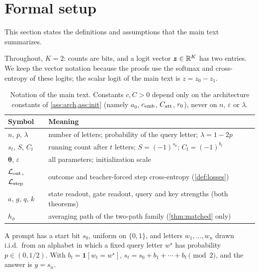 \providecommand{\reg}[1]{\ensuremath{\mathsf{#1}}}

\section{Formal setup}
\label{app:formal}

This section states the definitions and assumptions that the main text summarizes.

\label{app:setup}
Throughout, $K=2$: counts are bits, and a logit vector $\bm z\in\mathbb R^K$ has two entries. We keep the vector notation because the
proofs use the softmax and cross-entropy of these logits; the scalar logit of the main text is $z=z_0-z_1$.

\begin{table}[H]
\centering\small
\caption{Notation of the main text. Constants $c,C>0$ depend only on the architecture constants of
\cref{ass:arch,ass:init} (namely $a_0$, $c_{\mathrm{emb}}$, $C_{\mathrm{att}}$, $r_0$), never on $n$, $\varepsilon$ or $\lambda$.}
\label{tab:notation}
\begin{tabular}{@{}ll@{}}
\toprule
Symbol & Meaning\\
\midrule
$n$, $p$, $\lambda$ & number of letters; probability of the query letter; $\lambda=1-2p$\\
$s_t$, $S$, $C_t$ & running count after $t$ letters; $S=(-1)^{s_0}$; $C_t=(-1)^{b_t}$\\
$\bm\theta$, $\varepsilon$ & all parameters; initialization scale\\
$\mathcal L_{\mathrm{out}}$, $\mathcal L_{\mathrm{step}}$ & outcome and teacher-forced step cross-entropy (\cref{def:losses})\\
$a$, $g$, $q$, $k$ & state readout, gate readout, query and key strengths (both theorems)\\
$h_\phi$ & averaging path of the two-path family (\cref{thm:matched} only)\\
\bottomrule
\end{tabular}
\end{table}

\begin{definition}[Counting]
\label{def:task}
A prompt has a start bit $s_0$, uniform on $\{0,1\}$, and letters $w_1,\ldots,w_n$ drawn i.i.d.\ from an alphabet
in which a fixed query letter $w^\star$ has probability $p\in(0,1/2)$. With $b_t=\mathbf 1[w_t=w^\star]$,
$s_t=s_0+b_1+\cdots+b_t\pmod 2$, and the answer is $y=s_n$.
\end{definition}

